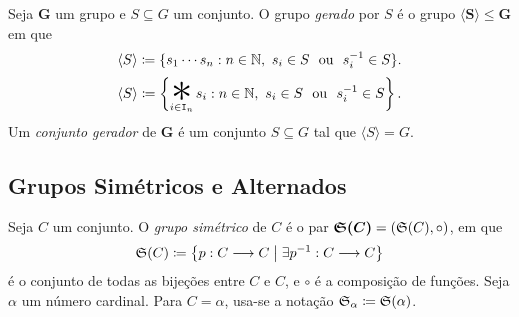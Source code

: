 \begin{defi}
Seja $\bm G$ um grupo e $S \subseteq G$ um conjunto. O grupo \emph{gerado} por $S$ é o grupo $\bm{\langle S \rangle} \leq \bm G$ em que
	\begin{equation*}
	\langle S \rangle \coloneqq \{s_1 \cdots s_n : n \in \mathbb{N},\ s_i \in S \text{\ \ ou\ \ } s_i^{-1} \in S\}.
	\end{equation*}
	\begin{equation*}
	\langle S \rangle \coloneqq \left\{\bigopb_{i \in \inte_n} s_i : n \in \N,\ s_i \in S \ou s_i\inv \in S\right\}.
	\end{equation*}
\noindent
Um \emph{conjunto gerador} de $\bm G$ é um conjunto $S \subseteq G$ tal que $\langle S \rangle = G$.
\end{defi}










\subsection{Grupos Simétricos e Alternados}

\begin{defi}
Seja $C$ um conjunto. O \emph{grupo simétrico} de $C$ é o par $\bm{\mathfrak{S}(C)} = (\mathfrak{S}(C),\circ)$, em que	
	\begin{equation*}
	\mathfrak{S}(C) \coloneqq \left\{p: C \longrightarrow C \;\middle\vert\; \exists p^{-1}: C \longrightarrow C \right\}
	\end{equation*}
é o conjunto de todas as bijeções entre $C$ e $C$, e $\circ$ é a composição de funções. Seja $\alpha$ um número cardinal. Para $C = \alpha$, usa-se a notação $\mathfrak{S}_{\alpha} \coloneqq \mathfrak{S}(\alpha)$.
\end{defi}

